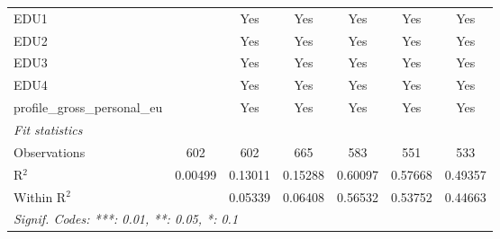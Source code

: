 \begin{tabular}{lcccccc}
   EDU1                                      &          & Yes           & Yes           & Yes           & Yes          & Yes\\  
   EDU2                                      &          & Yes           & Yes           & Yes           & Yes          & Yes\\  
   EDU3                                      &          & Yes           & Yes           & Yes           & Yes          & Yes\\  
   EDU4                                      &          & Yes           & Yes           & Yes           & Yes          & Yes\\  
   profile\_gross\_personal\_eu              &          & Yes           & Yes           & Yes           & Yes          & Yes\\  
   \midrule
   \emph{Fit statistics}\\
   Observations                              & 602      & 602           & 665           & 583           & 551          & 533\\  
   R$^2$                                     & 0.00499  & 0.13011       & 0.15288       & 0.60097       & 0.57668      & 0.49357\\  
   Within R$^2$                              &          & 0.05339       & 0.06408       & 0.56532       & 0.53752      & 0.44663\\  
   \midrule \midrule
   \multicolumn{7}{l}{\emph{Signif. Codes: ***: 0.01, **: 0.05, *: 0.1}}\\
\end{tabular}
\par\endgroup



